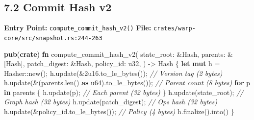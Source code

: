 \documentclass[
]{book}
\newenvironment{Shaded}{}{}
\newcommand{\BuiltInTok}[1]{\textcolor[rgb]{0.00,0.50,0.00}{#1}}
\newcommand{\CommentTok}[1]{\textcolor[rgb]{0.38,0.63,0.69}{\textit{#1}}}
\newcommand{\ControlFlowTok}[1]{\textcolor[rgb]{0.00,0.44,0.13}{\textbf{#1}}}
\newcommand{\DataTypeTok}[1]{\textcolor[rgb]{0.56,0.13,0.00}{#1}}
\newcommand{\DecValTok}[1]{\textcolor[rgb]{0.25,0.63,0.44}{#1}}
\newcommand{\KeywordTok}[1]{\textcolor[rgb]{0.00,0.44,0.13}{\textbf{#1}}}
\newcommand{\NormalTok}[1]{#1}
\newcommand{\OperatorTok}[1]{\textcolor[rgb]{0.40,0.40,0.40}{#1}}
\newcommand{\PreprocessorTok}[1]{\textcolor[rgb]{0.74,0.48,0.00}{#1}}
\begin{document}
\subsection{7.2 Commit Hash v2}\label{commit-hash-v2}

\textbf{Entry Point:} \texttt{compute\_commit\_hash\_v2()}
\textbf{File:} \texttt{crates/warp-core/src/snapshot.rs:244-263}

\begin{Shaded}
\begin{Highlighting}[]
\KeywordTok{pub}\NormalTok{(}\KeywordTok{crate}\NormalTok{) }\KeywordTok{fn}\NormalTok{ compute\_commit\_hash\_v2(}
\NormalTok{    state\_root}\OperatorTok{:} \OperatorTok{\&}\BuiltInTok{Hash}\OperatorTok{,}
\NormalTok{    parents}\OperatorTok{:} \OperatorTok{\&}\NormalTok{[}\BuiltInTok{Hash}\NormalTok{]}\OperatorTok{,}
\NormalTok{    patch\_digest}\OperatorTok{:} \OperatorTok{\&}\BuiltInTok{Hash}\OperatorTok{,}
\NormalTok{    policy\_id}\OperatorTok{:} \DataTypeTok{u32}\OperatorTok{,}
\NormalTok{) }\OperatorTok{{-}\textgreater{}} \BuiltInTok{Hash} \OperatorTok{\{}
    \KeywordTok{let} \KeywordTok{mut}\NormalTok{ h }\OperatorTok{=} \BuiltInTok{Hasher}\PreprocessorTok{::}\NormalTok{new()}\OperatorTok{;}
\NormalTok{    h}\OperatorTok{.}\NormalTok{update(}\OperatorTok{\&}\DecValTok{2u16}\OperatorTok{.}\NormalTok{to\_le\_bytes())}\OperatorTok{;}              \CommentTok{// Version tag (2 bytes)}
\NormalTok{    h}\OperatorTok{.}\NormalTok{update(}\OperatorTok{\&}\NormalTok{(parents}\OperatorTok{.}\NormalTok{len() }\KeywordTok{as} \DataTypeTok{u64}\NormalTok{)}\OperatorTok{.}\NormalTok{to\_le\_bytes())}\OperatorTok{;}  \CommentTok{// Parent count (8 bytes)}
    \ControlFlowTok{for}\NormalTok{ p }\KeywordTok{in}\NormalTok{ parents }\OperatorTok{\{}
\NormalTok{        h}\OperatorTok{.}\NormalTok{update(p)}\OperatorTok{;}                            \CommentTok{// Each parent (32 bytes)}
    \OperatorTok{\}}
\NormalTok{    h}\OperatorTok{.}\NormalTok{update(state\_root)}\OperatorTok{;}                       \CommentTok{// Graph hash (32 bytes)}
\NormalTok{    h}\OperatorTok{.}\NormalTok{update(patch\_digest)}\OperatorTok{;}                     \CommentTok{// Ops hash (32 bytes)}
\NormalTok{    h}\OperatorTok{.}\NormalTok{update(}\OperatorTok{\&}\NormalTok{policy\_id}\OperatorTok{.}\NormalTok{to\_le\_bytes())}\OperatorTok{;}         \CommentTok{// Policy (4 bytes)}
\NormalTok{    h}\OperatorTok{.}\NormalTok{finalize()}\OperatorTok{.}\NormalTok{into()}
\OperatorTok{\}}
\end{Highlighting}
\end{Shaded}
\end{document}

